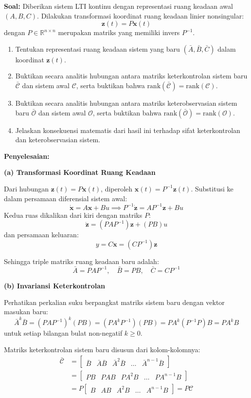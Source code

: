 \documentclass[11pt,a4paper]{article}
\begin{document}
\textbf{Soal:}  
Diberikan sistem LTI kontinu dengan representasi ruang keadaan awal $(A, B, C)$. Dilakukan transformasi koordinat ruang keadaan linier nonsingular:
$$\mathbf{z}(t) = P \mathbf{x}(t)$$
dengan $P \in \mathbb{R}^{n \times n}$ merupakan matriks yang memiliki invers $P^{-1}$.
\begin{enumerate}[label=(\alph*)]
    \item Tentukan representasi ruang keadaan sistem yang baru $(\bar{A}, \bar{B}, \bar{C})$ dalam koordinat $\mathbf{z}(t)$.
    \item Buktikan secara analitis hubungan antara matriks keterkontrolan sistem baru $\bar{\mathcal{C}}$ dan sistem awal $\mathcal{C}$, serta buktikan bahwa $\text{rank}(\bar{\mathcal{C}}) = \text{rank}(\mathcal{C})$.
    \item Buktikan secara analitis hubungan antara matriks keterobservasian sistem baru $\bar{\mathcal{O}}$ dan sistem awal $\mathcal{O}$, serta buktikan bahwa $\text{rank}(\bar{\mathcal{O}}) = \text{rank}(\mathcal{O})$.
    \item Jelaskan konsekuensi matematis dari hasil ini terhadap sifat keterkontrolan dan keterobservasian sistem.
\end{enumerate}

\textbf{Penyelesaian:}

\textbf{(a) Transformasi Koordinat Ruang Keadaan}

Dari hubungan $\mathbf{z}(t) = P \mathbf{x}(t)$, diperoleh $\mathbf{x}(t) = P^{-1} \mathbf{z}(t)$. Substitusi ke dalam persamaan diferensial sistem awal:
$$\dot{\mathbf{x}} = A \mathbf{x} + B u \implies P^{-1} \dot{\mathbf{z}} = A P^{-1} \mathbf{z} + B u$$
Kedua ruas dikalikan dari kiri dengan matriks $P$:
$$\dot{\mathbf{z}} = (P A P^{-1}) \mathbf{z} + (P B) u$$
dan persamaan keluaran:
$$y = C \mathbf{x} = (C P^{-1}) \mathbf{z}$$

Sehingga triple matriks ruang keadaan baru adalah:
$$\bar{A} = P A P^{-1}, \quad \bar{B} = P B, \quad \bar{C} = C P^{-1}$$

\textbf{(b) Invariansi Keterkontrolan}

Perhatikan perkalian suku berpangkat matriks sistem baru dengan vektor masukan baru:
$$\bar{A}^k \bar{B} = (P A P^{-1})^k (P B) = (P A^k P^{-1})(P B) = P A^k (P^{-1} P) B = P A^k B$$
untuk setiap bilangan bulat non-negatif $k \ge 0$.

Matriks keterkontrolan sistem baru disusun dari kolom-kolomnya:
\begin{align*}
    \bar{\mathcal{C}} &= \begin{bmatrix} \bar{B} & \bar{A}\bar{B} & \bar{A}^2\bar{B} & \dots & \bar{A}^{n-1}\bar{B} \end{bmatrix} \\
    &= \begin{bmatrix} P B & P A B & P A^2 B & \dots & P A^{n-1} B \end{bmatrix} \\
    &= P \begin{bmatrix} B & AB & A^2 B & \dots & A^{n-1} B \end{bmatrix} = P \mathcal{C}
\end{align*}
\end{document}
